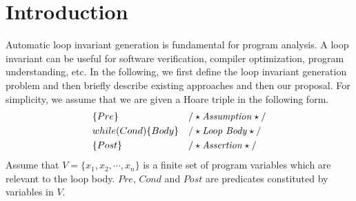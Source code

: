 
\section{Introduction} %
\label{sec:introduction}

Automatic loop invariant generation is fundamental for program analysis. A loop invariant can be useful for software verification, compiler optimization, program understanding, etc. In the following, we first define the loop invariant generation problem and then briefly describe existing approaches and then our proposal. For simplicity, we assume that we are given a Hoare triple in the following form.
\begin{align*}
&\{Pre\} & & /\star\text{\emph{Assumption}}\star/ \\
& while (Cond) \{ Body \} && /\star\text{\emph{Loop Body}}\star/\\
&\{ Post \} & & /\star\text{\emph{Assertion}}\star/
\end{align*}
Assume that $V = \{x_1{,} x_2{,} \cdots{,} x_n\}$ is a finite set of program variables which are relevant to the loop body. $Pre$, $Cond$ and $Post$ are predicates constituted by variables in $V$.

